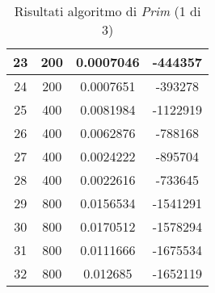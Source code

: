 \begin{table}[H]
\begin{tabular}{|c|c|c|c|}
		\hline
		23 & 200 & 0.0007046 & -444357\\
		\hline
		24 & 200 & 0.0007651 & -393278\\
		\hline\hline
		25 & 400 & 0.0081984 & -1122919\\
		\hline
		26 & 400 & 0.0062876 & -788168\\
		\hline
		27 & 400 & 0.0024222 & -895704\\
		\hline
		28 & 400 & 0.0022616 & -733645\\
		\hline\hline
		29 & 800 & 0.0156534 & -1541291\\
		\hline
		30 & 800 & 0.0170512 & -1578294\\
		\hline
		31 & 800 & 0.0111666 & -1675534\\
		\hline
		32 & 800 & 0.012685 & -1652119\\
		\hline
	\end{tabular}
	\caption{Risultati algoritmo di \textit{Prim} (1 di 3)}
\end{table}

